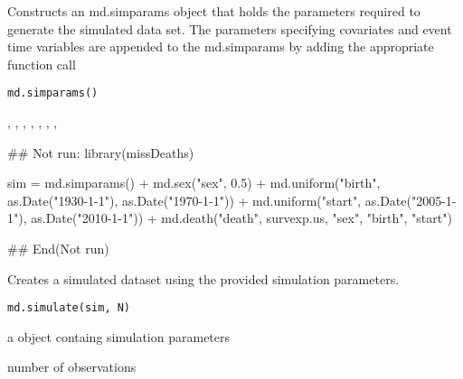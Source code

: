 \documentclass[a4paper]{book}
\begin{document}
%
\begin{Description}\relax
Constructs an md.simparams object that holds the parameters required to generate the simulated data set. 
The parameters specifying covariates and event time variables are appended to the md.simparams by 
adding the appropriate function call
\end{Description}
%
\begin{Usage}
\begin{verbatim}
md.simparams()
\end{verbatim}
\end{Usage}
%
\begin{SeeAlso}\relax
{}, , , , , , , 
\end{SeeAlso}
%
\begin{Examples}
\begin{ExampleCode}

## Not run: 
library(missDeaths)

sim = md.simparams() +
   md.sex("sex", 0.5) + 
   md.uniform("birth", as.Date("1930-1-1"), as.Date("1970-1-1")) +
   md.uniform("start", as.Date("2005-1-1"), as.Date("2010-1-1")) +
   md.death("death", survexp.us, "sex", "birth", "start") 

## End(Not run)

\end{ExampleCode}
\end{Examples}
%
\begin{Description}\relax
Creates a simulated dataset using the provided simulation parameters.
\end{Description}
%
\begin{Usage}
\begin{verbatim}
md.simulate(sim, N)
\end{verbatim}
\end{Usage}
%
\begin{Arguments}
\begin{ldescription}
\item[\code{sim}] a  object containg simulation parameters

\item[\code{N}] number of observations
\end{ldescription}
\end{Arguments}
\end{document}

